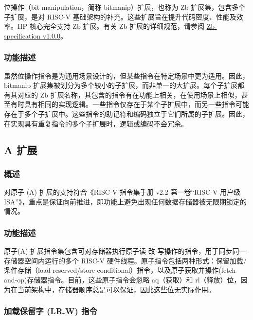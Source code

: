 \documentclass[main\_\_CN.tex]{subfiles}
\begin{document}
位操作（bit manipulation，简称 bitmanip）扩展，也称为 Zb 扩展集，包含多个子扩展，是对 RISC-V 基础架构的补充。这些扩展旨在提升代码密度、性能及效率。HP 核心完全支持 Zb 扩展。有关 Zb 扩展的详细规范，请参阅 \href{https://github.com/riscv/riscv-b}{Zb-specification v1.0.0}。

\subsubsection{功能描述}
\label{sec:riscvcpu-zb-func-descr}

虽然位操作指令是为通用场景设计的，但某些指令在特定场景中更为适用。因此，bitmanip 扩展集被划分为多个较小的子扩展，而非单一的大扩展。每个子扩展都有其对应的 Zb 扩展名称，其包含的指令有在功能上相关，在使用场景上相似，甚至有时具有相同的实现逻辑。一些指令仅存在于某个子扩展中，而另一些指令可能存在于多个子扩展中。这些指令的助记符和编码独立于它们所属的子扩展。因此，在实现具有重复指令的多个子扩展时，逻辑或编码不会冗余。

\newpage


\newpage
\subsection{A 扩展}
\label{sec:riscvcpu-atomic}

\subsubsection{概述}
\label{sec:riscvcpu-atomic-overview}

对原子 (A) 扩展的支持符合《RISC-V 指令集手册 v2.2 第一卷“RISC-V 用户级 ISA”》，重点是保证向前推进，即功能上避免出现任何数据存储器被无限期锁定的情况。

\subsubsection{功能描述}
\label{sec:riscvcpu-atomic-func-descr}

原子(A) 扩展指令集包含可对存储器执行原子读-改-写操作的指令，用于同步同一存储器空间内运行的多个 RISC-V 硬件线程。原子指令包括两种形式：保留加载/条件存储（load-reserved/store-conditional）指令，以及原子获取并操作(fetch-and-op)存储器指令。目前，这些原子指令会忽略 aq（获取）和 rl（释放）位，因为在当前架构中，存储器顺序总是可以保证，因此这些位无实际作用。

\subsubsection{加载保留字 (LR.W) 指令}
\label{sec:riscvcpu-atomic-lr}
\end{document}
